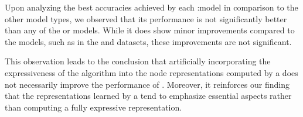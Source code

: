 \begin{table}[htb]
	\caption{Accuracy and standard deviation in percent achieved by the best-performing \wlnn, \wl:\gnn, and \gnn model on each classification dataset.}
	\label{tab:wlnn_gnn}
\end{table}
Upon analyzing the best accuracies achieved by each \wl:\gnn model in comparison to the other model types, we observed that its performance is not significantly better than any of the \gnn or \wlnn models. While it does show minor improvements compared to the \gnn models, such as in the \enzymes and \proteins datasets, these improvements are not significant.

This observation leads to the conclusion that artificially incorporating the expressiveness of the \wl algorithm into the node representations computed by a \gnn does not necessarily improve the performance of \gnns. Moreover, it reinforces our finding that the representations learned by a \gnn tend to emphasize essential aspects rather than computing a fully expressive representation.

\FloatBarrier
